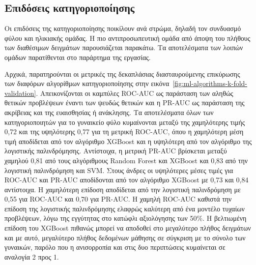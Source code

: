 \documentclass[12pt]{report}
\begin{document}
        \subsection{Επιδόσεις κατηγοριοποίησης}
                Οι επιδόσεις της κατηγοριοποίησης ποικίλουν ανά στρώμα, δηλαδή τον συνδυασμό φύλου και ηλικιακής ομάδας. Η πιο αντιπροσωπευτική ομάδα από άποψη του πλήθους των διαθέσιμων δειγμάτων παρουσιάζεται παρακάτω. Τα αποτελέσματα των λοιπών ομάδων παρατίθενται στο παράρτημα της εργασίας.
            \par
                Αρχικά, παρατηρούνται οι μετρικές της δεκαπλάσιας διασταυρούμενης επικύρωσης των διαφόρων αλγορίθμων κατηγοριοποίησης στην εικόνα~\ref{fig:ml-algorithms-k-fold-validation}. Απεικονίζονται οι καμπύλες ROC-AUC ως παράσταση των αληθώς θετικών προβλέψεων έναντι των ψευδώς θετικών και η PR-AUC ως παράσταση της ακρίβειας και της ευαισθησίας ή ανάκλησης. Τα αποτελέσματα όλων των κατηγοριοποιητών για το γυναικείο φύλο κυμαίνονται μεταξύ της χαμηλότερης τιμής 0,72 και της υψηλότερης 0,77 για τη μετρική ROC-AUC, όπου η χαμηλότερη μέση τιμή αποδίδεται από τον αλγόριθμο XGBoost και η υψηλότερη από τον αλγόριθμο της λογιστικής παλινδρόμησης. Αντίστοιχα, η μετρική PR-AUC βρίσκεται μεταξύ χαμηλού 0,81 από τους αλγόριθμους Random Forest και XGBoost και 0,83 από την λογιστική παλινδρόμηση και SVM. Στους άνδρες οι υψηλότερες μέσες τιμές για ROC-AUC και PR-AUC αποδίδονται από τον αλγόριθμο XGBoost με 0,73 και 0,84 αντίστοιχα. Η χαμηλότερη επίδοση αποδίδεται από την λογιστική παλινδρόμηση με 0,55 για ROC-AUC και 0,70 για PR-AUC. Η χαμηλή ROC-AUC καθιστά την επίδοση της λογιστικής παλινδρόμησης ελαφρώς καλύτερη από ένα μοντέλο τυχαίων προβλέψεων, λόγω της εγγύτητας στο κατώφλι αξιολόγησης των 50\%. Η βελτιωμένη επίδοση του XGBoost πιθανώς μπορεί να αποδοθεί στο μεγαλύτερο πλήθος δειγμάτων και με αυτό, μεγαλύτερο πλήθος δεδομένων μάθησης σε σύγκριση με το σύνολο των γυναικών, παρόλο που η ανισορροπία και στις δυο περιπτώσεις κυμαίνεται σε αναλογία 2 προς 1.      
                \newpage
\end{document}
